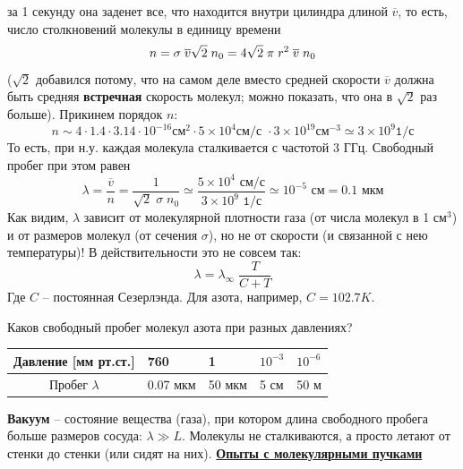 \documentclass[12pt,epsfig,color,russian]{article}
\begin{document}
за 1 секунду она заденет все, что находится внутри цилиндра длиной $\overline{v}$, то есть, число столкновений молекулы в единицу времени\vspace{-2mm}
\begin{displaymath}
n=\sigma\;\overline{v}\sqrt{2}\;n_0=4\sqrt{2}\;\pi\;r^2\;\overline{v}\;n_0
\vspace{-2mm}
\end{displaymath}
($\sqrt{2}$ добавился потому, что на самом деле вместо средней скорости $\overline{v}$ должна быть средняя {\bf встречная} скорость молекул; можно показать, что она в $\sqrt{2}$ раз больше). Прикинем порядок $n$:
\begin{displaymath}
n\sim4\cdot1.4\cdot3.14\cdot10^{-16}\texttt{см}^2\cdot5\times10^4\texttt{см/с }\cdot3\times10^{19}\texttt{см}^{-3}\simeq3\times10^9\texttt{1/с}
\end{displaymath}
То есть, при н.у. каждая молекула сталкивается с частотой 3 ГГц. Свободный пробег при этом равен
\begin{displaymath}
\lambda=\frac{\overline{v}}{n}=\frac1{\sqrt{2}\;\sigma\;n_0}\simeq
\frac{5\times10^4\texttt{ см/с}}{3\times10^9\texttt{ 1/с}}\simeq10^{-5}\texttt{ см}=0.1\texttt{ мкм}
\end{displaymath}
Как видим, $\lambda$ зависит от молекулярной плотности газа (от числа молекул в 1 см$^3$) и от размеров молекул (от сечения $\sigma$), но не от скорости (и связанной с нею температуры)! В действительности это не совсем так:
\begin{displaymath}
\lambda=\lambda_\infty\;\frac{T}{C+T}
\end{displaymath}
Где $C$ -- постоянная Сезерлэнда. Для азота, например, $C=102.7 K$.

Каков свободный пробег молекул азота при разных давлениях?
\begin{center}
\begin{tabular}{|c||p{22mm}|p{22mm}|p{22mm}|p{22mm}|}\hline
Давление [мм рт.ст.] & 760  & 1  & $10^{-3}$ & $10^{-6}$ \\ \hline \hline
Пробег $\lambda$ & 0.07 мкм & 50 мкм & 5 см & 50 м\\ \hline
\end{tabular}
\end{center}
{\bf Вакуум} -- состояние вещества (газа), при котором длина свободного пробега больше размеров сосуда: $\lambda\gg L$. Молекулы не сталкиваются, а просто летают от стенки до стенки (или сидят на них).
\newpage
\underline{\bf Опыты с молекулярными пучками}\\
\end{document}
